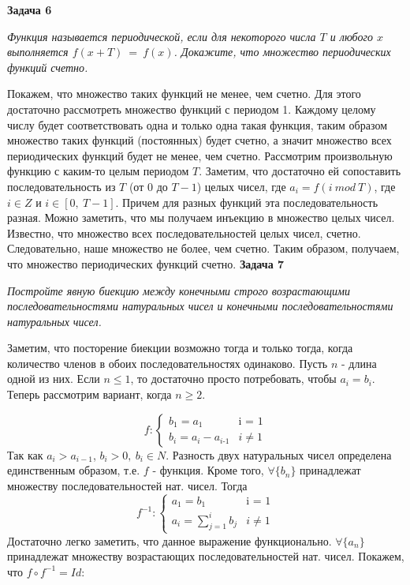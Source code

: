 \documentclass{article}
\begin{document}
\newline \newline
\textbf{Задача 6}
\begin{center}
\textit{Функция называется периодической, если для некоторого числа $T$ и любого $x$ выполняется $f(x+T)~=~f(x)$. Докажите, что множество периодических функций счетно.}
\end{center}
Покажем, что множество таких функций не менее, чем счетно. Для этого достаточно рассмотреть множество функций с периодом 1. Каждому целому числу будет соответствовать одна и только одна такая функция, таким образом множество таких функций (постоянных) будет счетно, а значит множество всех периодических функций будет не менее, чем счетно.
Рассмотрим произвольную функцию с каким-то целым периодом $T$. Заметим, что достаточно ей сопоставить последовательность из $T$ (от $0$ до $T-1$) целых чисел, где $a_{\textit{i}}=f(i ~ mod ~ T)$, где $i \in {Z}$ и $i \in [0,~T-1]$. Причем для разных функций эта последовательность разная. Можно заметить, что мы получаем инъекцию в множество целых чисел. Известно, что множество всех последовательностей целых чисел, счетно. Следовательно, наше множество не более, чем счетно. Таким образом, получаем, что множество периодических функций счетно.
\newline \newline
\textbf{Задача 7}
\begin{center}
\textit{Постройте явную биекцию между конечными строго возрастающими последовательностями натуральных чисел и конечными последовательностями натуральных чисел.}
\end{center}
Заметим, что посторение биекции возможно тогда и только тогда, когда количество членов в обоих последовательностях одинаково. Пусть $n$ - длина одной из них. Если $n\leq1$, то достаточно просто потребовать, чтобы $a_{\textit{i}} = b_{\textit{i}}$. Теперь рассмотрим вариант, когда $n\geq2$.

\begin{equation*}
f : 
 \begin{cases}
   b_{\textit{1}} = a_{\textit{1}} &\text{i = 1}\\
   b_{\textit{i}} = a_{\textit{i}} - a_{\textit{i-1}} &\text{$i \neq 1$}
 \end{cases}
\end{equation*}
Так как $a_i>a_{i-1}$, $b_i>0,~ b_i \in N$. Разность двух натуральных чисел определена единственным образом, т.е. $f$ - функция. Кроме того, $\forall\{b_n\}$ принадлежат множеству последовательностей нат. чисел.\newline
Тогда 
 \begin{equation*}
f^{-1} : 
 \begin{cases}
   a_{\textit{1}} = b_{\textit{1}} &\text{i = 1}\\
   a_{\textit{i}} = \sum\nolimits_{j=1}^i b_j &\text{$i \neq 1$}
 \end{cases}
\end{equation*}
 Достаточно легко заметить, что данное выражение функционально. $\forall\{a_n\}$ принадлежат множеству возрастающих последовательностей нат. чисел.
 Покажем, что $f \circ f^{-1}=Id:$
 
\end{document}
